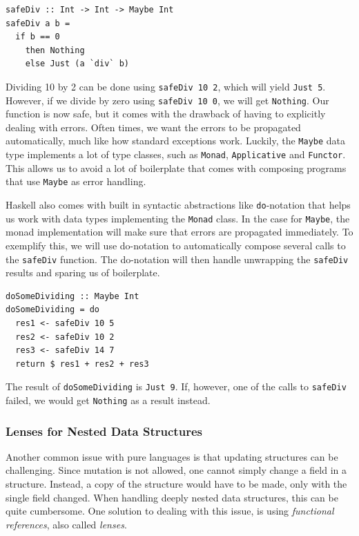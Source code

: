 \documentclass[a4paper,english]{ifimaster}
\begin{document}
\begin{verbatim}
safeDiv :: Int -> Int -> Maybe Int
safeDiv a b =
  if b == 0
    then Nothing
    else Just (a `div` b)
\end{verbatim}

Dividing 10 by 2 can be done using \texttt{safeDiv 10 2}, which will yield \texttt{Just 5}. However, if we divide by zero using \texttt{safeDiv 10 0}, we will get \texttt{Nothing}. Our function is now safe, but it comes with  the drawback of having to explicitly dealing with errors. Often times, we want the errors to be propagated automatically, much like how standard exceptions work. Luckily, the \texttt{Maybe} data type implements a lot of type classes, such as \texttt{Monad}, \texttt{Applicative} and \texttt{Functor}. This allows us to avoid a lot of boilerplate that comes with composing programs that use \texttt{Maybe} as error handling.

Haskell also comes with built in syntactic abstractions like \texttt{do}-notation that helps us work with data types implementing the \texttt{Monad} class. In the case for \texttt{Maybe}, the monad implementation will make sure that errors are propagated immediately. To exemplify this, we will use do-notation to automatically compose several calls to the \texttt{safeDiv} function. The do-notation will then handle unwrapping the \texttt{safeDiv} results and sparing us of boilerplate.

\begin{verbatim}
doSomeDividing :: Maybe Int
doSomeDividing = do
  res1 <- safeDiv 10 5
  res2 <- safeDiv 10 2
  res3 <- safeDiv 14 7
  return $ res1 + res2 + res3
\end{verbatim}

The result of \texttt{doSomeDividing} is \texttt{Just 9}. If, however, one of the calls to \texttt{safeDiv} failed, we would get \texttt{Nothing} as a result instead.

\subsubsection{Lenses for Nested Data Structures}%
\label{ssub:optics_for_nested_data_structures}

Another common issue with pure languages is that updating structures can be challenging. Since mutation is not allowed, one cannot simply change a field in a structure. Instead, a copy of the structure would have to be made, only with the single field changed. When handling deeply nested data structures, this can be quite cumbersome. One solution to dealing with this issue, is using \textit{functional references}, also called \textit{lenses}.
\end{document}
